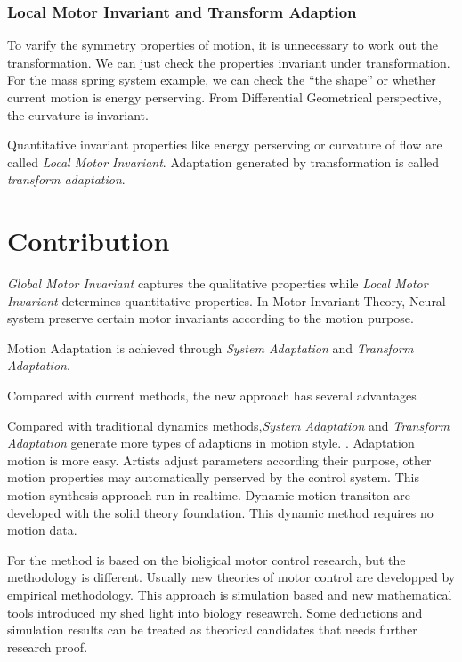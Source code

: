 \subsubsection*{Local Motor Invariant and Transform Adaption}
To varify the symmetry properties of motion, it is unnecessary to work out the transformation. 
We can just check the properties invariant under transformation.
For the mass spring system example, we can check the ``the shape'' or whether current motion is energy perserving. 
From Differential Geometrical perspective,  the curvature is invariant. 


Quantitative invariant properties like energy perserving or curvature of flow are called \emph{Local Motor Invariant}. 
Adaptation generated by transformation is called \emph{transform adaptation}.

\section{Contribution}
\emph{Global Motor Invariant} captures the qualitative properties while \emph{Local Motor Invariant} determines quantitative properties. 
In Motor Invariant Theory,  Neural system preserve certain motor invariants according to the motion purpose. 

Motion Adaptation is achieved through \emph{System Adaptation} and \emph{Transform Adaptation}.

Compared with current \cms methods, the new approach has several advantages
\begin{enumerate}
Compared with traditional dynamics \cms methods,\emph{System Adaptation} and \emph{Transform Adaptation} generate more types of adaptions in motion style.
.
Adaptation motion is more easy. 
Artists  adjust  parameters according their purpose, other motion properties may automatically perserved by the control system.
 This motion synthesis approach run in realtime.
Dynamic motion transiton are developed with the solid theory foundation.
This dynamic method requires no motion data.

\end{enumerate}

For the method is based on the bioligical motor control research, but the methodology is different.
Usually new  theories of motor control are developped by empirical methodology.
This approach is simulation based and new mathematical tools introduced my shed light into biology reseawrch.
Some deductions and simulation results can be treated as theorical candidates that needs further research proof.

